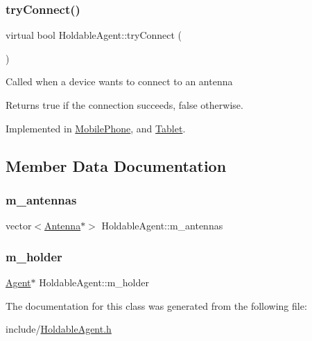 \subsubsection{\texorpdfstring{try\+Connect()}{tryConnect()}}
{\footnotesize\ttfamily virtual bool Holdable\+Agent\+::try\+Connect (\begin{DoxyParamCaption}{ }\end{DoxyParamCaption})\hspace{0.3cm}{\ttfamily [pure virtual]}}

Called when a device wants to connect to an antenna \begin{DoxyReturn}{Returns}
true if the connection succeeds, false otherwise. 
\end{DoxyReturn}


Implemented in \hyperlink{class_mobile_phone_ad91afa811cea8ee124167f5941bcda1b}{Mobile\+Phone}, and \hyperlink{class_tablet_a2328422e1706dfeb2b51a6960e6879f0}{Tablet}.



\subsection{Member Data Documentation}
\mbox{\label{class_holdable_agent_a5f104212204e4c6761bed1d61fab100b}} 
\subsubsection{\texorpdfstring{m\+\_\+antennas}{m\_antennas}}
{\footnotesize\ttfamily vector$<$\hyperlink{class_antenna}{Antenna}$\ast$$>$ Holdable\+Agent\+::m\+\_\+antennas\hspace{0.3cm}{\ttfamily [private]}}

\mbox{\label{class_holdable_agent_ae9c449c1831f933b5b6b6f71e425279b}} 
\subsubsection{\texorpdfstring{m\+\_\+holder}{m\_holder}}
{\footnotesize\ttfamily \hyperlink{class_agent}{Agent}$\ast$ Holdable\+Agent\+::m\+\_\+holder\hspace{0.3cm}{\ttfamily [private]}}



The documentation for this class was generated from the following file\+:\begin{DoxyCompactItemize}
\item 
include/\hyperlink{_holdable_agent_8h}{Holdable\+Agent.\+h}\end{DoxyCompactItemize}
